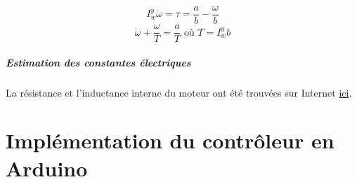 \documentclass{report}
\begin{document}
$$I_w^y\dot{\omega} = \tau = \frac{a}{b} - \frac{\omega}{b}$$
$$\dot{\omega} +  \frac{\omega}{T} = \frac{a}{T} \text{  où  } T=I_w^yb$$


\paragraph{Estimation des constantes électriques}
La résistance et l'inductance interne du moteur ont été trouvées sur Internet 
\href{https://forum.pololu.com/t/mechanics-and-electrical-parameters/18153/2}{ici}.

\chapter{Implémentation du contrôleur en Arduino}

\end{document}
